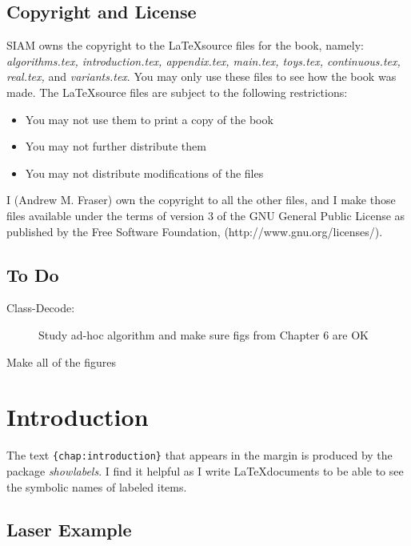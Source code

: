 \documentclass[prelim,showlabels]{book}
\begin{document}
\section*{Copyright and License}

SIAM owns the copyright to the \LaTeX source files for the book,
namely: \emph{algorithms.tex, introduction.tex, appendix.tex,
  main.tex, toys.tex, continuous.tex, real.tex,} and
\emph{variants.tex}.  You may only use these files to see how the book
was made.  The \LaTeX source files are subject to the following
restrictions:
\begin{itemize}
\item You may not use them to print a copy of the book
\item You may not further distribute them
\item You may not distribute modifications of the files
\end{itemize}

I (Andrew M. Fraser) own the copyright to all the other files, and I
make those files available under the terms of version 3 of the GNU
General Public License as published by the Free Software Foundation,
(http://www.gnu.org/licenses/).

\section*{To Do}
\begin{description}
\item[Class-Decode:] Study ad-hoc algorithm and make sure figs from
  Chapter 6 are OK
\item[Make all of the figures] 
\end{description}

\mainmatter
\chapter{Introduction}
\label{chap:introduction}

The text \texttt{\{chap:introduction\}}
that appears in the margin is produced by the package
\emph{showlabels}.  I find it helpful as I write \LaTeX documents to
be able to see the symbolic names of labeled items.

\section{Laser Example}
\end{document}
